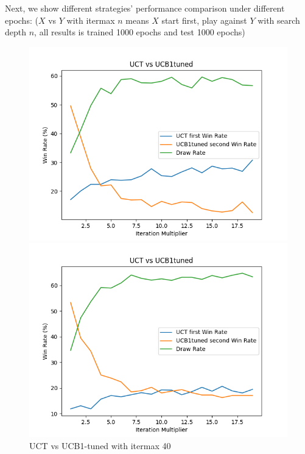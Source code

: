\documentclass[11pt]{article}
\theoremstyle{definitionstyle}
\begin{document}
Next, we show different strategies' performance comparison under different epochs: ($X$ vs $Y$ with itermax $n$ means $X$ start first, play against $Y$ with search depth $n$, all results is trained 1000 epochs and test 1000 epochs)
\begin{figure}[H]
    \centering
    \begin{minipage}{0.32\textwidth}
        \includegraphics[width=\textwidth]{mcts/figs/40/UCT vs UCB1tuned2.png}
        \caption{UCT vs UCB1-tuned with itermax 40}
        \label{fig:401}
    \end{minipage}
    \hfill
    \begin{minipage}{0.32\textwidth}
        \includegraphics[width=\textwidth]{mcts/figs/80/UCT vs UCB1tuned2.png}

\end{minipage}
\end{figure}
\end{document}
